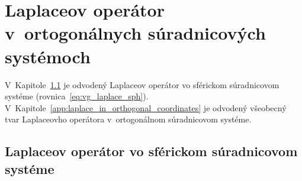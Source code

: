 \documentclass[a4paper,12pt]{book}
\begin{document}
\chapter{Laplaceov operátor v~ortogonálnych súradnicových systémoch}
\label{app:laplace_in_spherical_coordinates}

V~Kapitole~\ref{app:laplace_in_spherical_system} je odvodený Laplaceov operátor 
vo sférickom súradnicovom systéme (rovnica~\ref{eq:vg_laplace_sph}).  
V~Kapitole~\ref{app:laplace_in_orthogonal_coordinates} je odvodený všeobecný 
tvar Laplaceovho operátora v~ortogonálnom súradnicovom systéme.



\section{Laplaceov operátor vo sférickom súradnicovom systéme}
\label{app:laplace_in_spherical_system}
\end{document}

